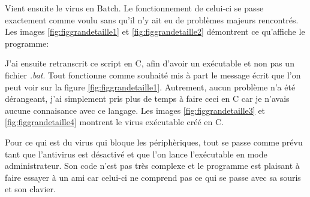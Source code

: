 \medskip

Vient ensuite le virus en Batch. Le fonctionnement de celui-ci se passe exactement comme voulu sans qu'il n'y ait eu de problèmes majeurs rencontrés. Les images \ref{fig:figgrandetaille1} et \ref{fig:figgrandetaille2} démontrent ce qu'affiche le programme:

\medskip

\medskip

J'ai ensuite retranscrit ce script en C, afin d'avoir un exécutable et non pas un fichier \textit{.bat}. Tout fonctionne comme souhaité mis à part le message écrit que l'on peut voir sur la figure \ref{fig:figgrandetaille1}. Autrement, aucun problème n'a été dérangeant, j'ai simplement pris plus de temps à faire ceci en C car je n'avais aucune connaisance avec ce langage. Les images \ref{fig:figgrandetaille3} et \ref{fig:figgrandetaille4} montrent le virus exécutable créé en C.




\medskip

Pour ce qui est du virus qui bloque les périphèriques, tout se passe comme prévu tant que l'antivirus est désactivé et que l'on lance l'exécutable en mode administrateur. Son code n'est pas très complexe et le programme est plaisant à faire essayer à un ami car celui-ci ne comprend pas ce qui se passe avec sa souris et son clavier.

\medskip

 
